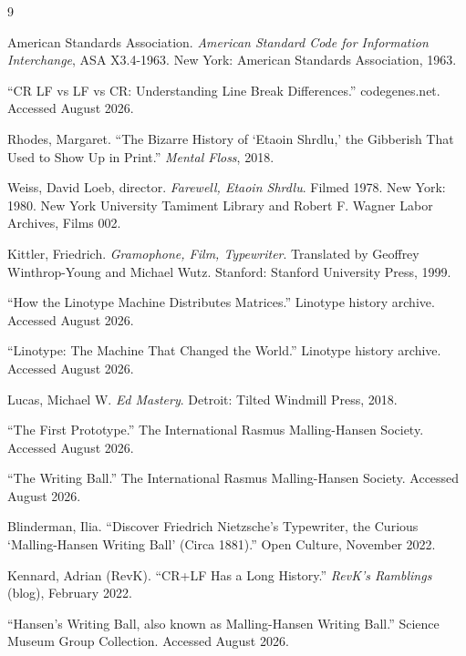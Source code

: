 \documentclass[11pt]{article}
\begin{document}
\begin{thebibliography}{9}

American Standards Association. \textit{American Standard Code for Information Interchange}, ASA X3.4-1963. New York: American Standards Association, 1963.

``CR LF vs LF vs CR: Understanding Line Break Differences.'' codegenes.net. Accessed August 2026.

Rhodes, Margaret. ``The Bizarre History of `Etaoin Shrdlu,' the Gibberish That Used to Show Up in Print.'' \textit{Mental Floss}, 2018.

Weiss, David Loeb, director. \textit{Farewell, Etaoin Shrdlu}. Filmed 1978. New York: 1980. New York University Tamiment Library and Robert F. Wagner Labor Archives, Films 002.

Kittler, Friedrich. \textit{Gramophone, Film, Typewriter}. Translated by Geoffrey Winthrop-Young and Michael Wutz. Stanford: Stanford University Press, 1999.

``How the Linotype Machine Distributes Matrices.'' Linotype history archive. Accessed August 2026.

``Linotype: The Machine That Changed the World.'' Linotype history archive. Accessed August 2026.

Lucas, Michael W. \textit{Ed Mastery}. Detroit: Tilted Windmill Press, 2018.

``The First Prototype.'' The International Rasmus Malling-Hansen Society. Accessed August 2026.

``The Writing Ball.'' The International Rasmus Malling-Hansen Society. Accessed August 2026.

Blinderman, Ilia. ``Discover Friedrich Nietzsche's Typewriter, the Curious `Malling-Hansen Writing Ball' (Circa 1881).'' Open Culture, November 2022.

Kennard, Adrian (RevK). ``CR+LF Has a Long History.'' \textit{RevK's Ramblings} (blog), February 2022.

``Hansen's Writing Ball, also known as Malling-Hansen Writing Ball.'' Science Museum Group Collection. Accessed August 2026.

\end{thebibliography}
\end{document}
